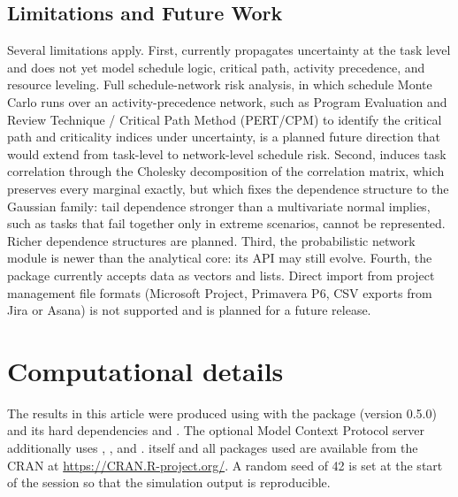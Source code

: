 \documentclass[
]{jss}
\begin{document}
\subsection{Limitations and Future
Work}\label{limitations-and-future-work}

Several limitations apply. First,  currently propagates
uncertainty at the task level and does not yet model schedule logic,
critical path, activity precedence, and resource leveling. Full
schedule-network risk analysis, in which schedule Monte Carlo runs over
an activity-precedence network, such as Program Evaluation and Review
Technique / Critical Path Method (PERT/CPM) to identify the critical
path and criticality indices under uncertainty, is a planned future
direction that would extend  from task-level to network-level
schedule risk. Second,  induces task correlation through the
Cholesky decomposition of the correlation matrix, which preserves every
marginal exactly, but which fixes the dependence structure to the
Gaussian family: tail dependence stronger than a multivariate normal
implies, such as tasks that fail together only in extreme scenarios,
cannot be represented. Richer dependence structures are planned. Third,
the probabilistic network module is newer than the analytical core: its
API may still evolve. Fourth, the package currently accepts data as
 vectors and lists. Direct import from project management
file formats (Microsoft Project, Primavera P6, CSV exports from Jira or
Asana) is not supported and is planned for a future release.

\section*{Computational details}\label{computational-details}

The results in this article were produced using 
\citep{RCore} with the  package (version 0.5.0) and its hard
dependencies  \citep{mc2d} and 
\citep{Elzhov2016}. The optional Model Context Protocol server
additionally uses  \citep{ellmer}, , and
.  itself and all packages used are available
from the CRAN at \url{https://CRAN.R-project.org/}. A random seed of 42
is set at the start of the session so that the simulation output is
reproducible.

\renewcommand\refname{References}

\end{document}
